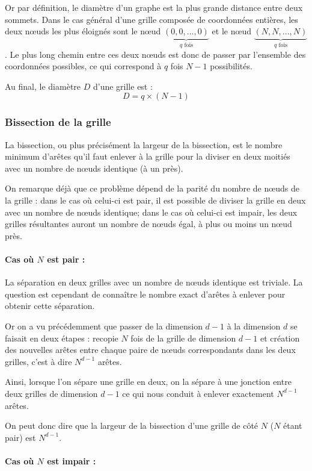 Or par définition, le diamètre d'un graphe est la plus grande distance entre deux sommets. Dans le cas général d'une grille composée de coordonnées entières, les deux nœuds les plus éloignés sont le nœud $\underbrace{(0,0,...,0)}_{q \text{ fois}}$ et le nœud $\underbrace{(N,N,...,N)}_{q \text{ fois}}$. Le plus long chemin entre ces deux nœuds est donc de passer par l'ensemble des coordonnées possibles, ce qui correspond à $q$ fois $N-1$ possibilités.

Au final, le diamètre $D$ d'une grille est : $$D = q\times(N-1)$$

\subsubsection*{Bissection de la grille}
La bissection, ou plus précisément la largeur de la bissection, est le nombre minimum d'arêtes qu'il faut enlever à la grille pour la diviser en deux moitiés avec un nombre de nœuds identique (à un près).

On remarque déjà que ce problème dépend de la parité du nombre de nœuds de la grille : dans le cas où celui-ci est pair, il est possible de diviser la grille en deux avec un nombre de nœuds identique; dans le cas où celui-ci est impair, les deux grilles résultantes auront un nombre de nœuds égal, à plus ou moins un nœud près.

\paragraph{Cas où $N$ est pair :}

La séparation en deux grilles avec un nombre de nœuds identique est triviale. La question est cependant de connaître le nombre exact d'arêtes à enlever pour obtenir cette séparation.

Or on a vu précédemment que passer de la dimension $d-1$ à la dimension $d$ se faisait en deux étapes : recopie $N$ fois de la grille de dimension $d-1$ et création des nouvelles arêtes entre chaque paire de nœuds correspondants dans les deux grilles, c'est à dire $N^{d-1}$ arêtes.

Ainsi, lorsque l'on sépare une grille en deux, on la sépare à une jonction entre deux grilles de dimension $d-1$ ce qui nous conduit à enlever exactement $N^{d-1}$ arêtes.

On peut donc dire que la largeur de la bissection d'une grille de côté $N$ ($N$ étant pair) est $N^{d-1}$.

\paragraph{Cas où $N$ est impair :}

